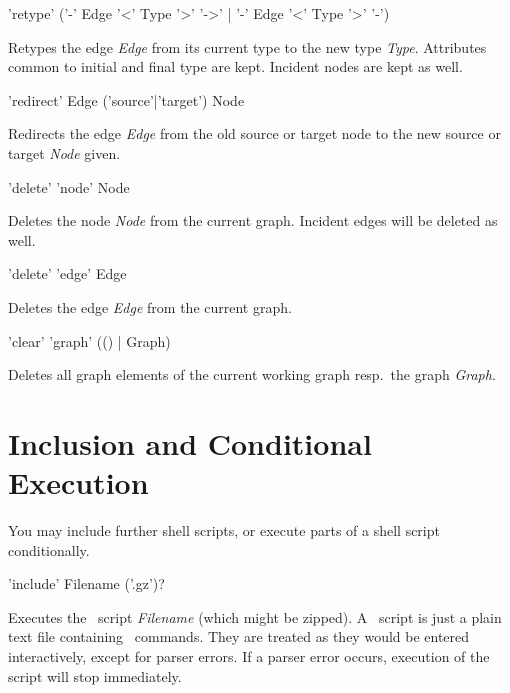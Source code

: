 \begin{rail}
  'retype' ('-' Edge '<' Type '>' '->' | '-' Edge '<' Type '>' '-')
\end{rail}
Retypes the edge \emph{Edge} from its current type to the new type \emph{Type}. Attributes common to initial and final type are kept. Incident nodes are kept as well.

\begin{rail}
  'redirect' Edge ('source'|'target') Node
\end{rail}
Redirects the edge \emph{Edge} from the old source or target node to the new source or target \emph{Node} given.

\begin{rail}
  'delete' 'node' Node
\end{rail}
Deletes the node \emph{Node} from the current graph.
Incident edges will be deleted as well.

\begin{rail}
  'delete' 'edge' Edge
\end{rail}
Deletes the edge \emph{Edge} from the current graph.

\begin{rail}
  'clear' 'graph' (() | Graph)
\end{rail}
Deletes all graph elements of the current working graph resp.\ the graph \emph{Graph}.


\section{Inclusion and Conditional Execution}
\label{inclcondexeccommands}

You may include further shell scripts, or execute parts of a shell script conditionally.

\begin{rail}
  'include' Filename ('.gz')?
\end{rail}
Executes the \GrShell\ script \emph{Filename} (which might be zipped).
A \GrShell\ script is just a plain text file containing \GrShell\ commands.
They are treated as they would be entered interactively, except for parser errors.
If a parser error occurs, execution of the script will stop immediately.

